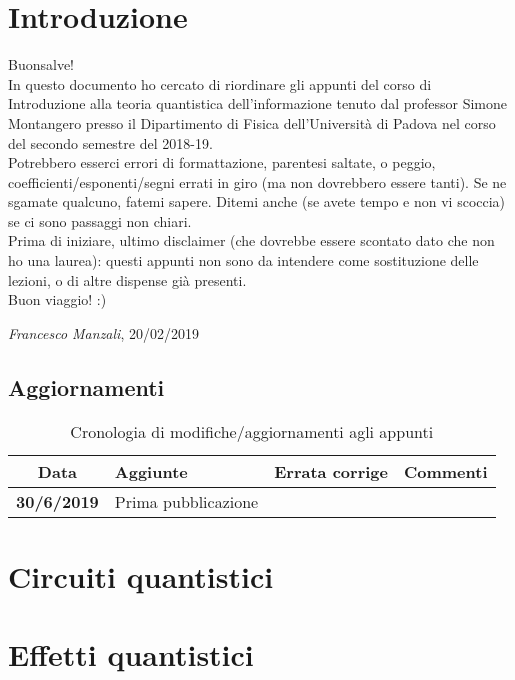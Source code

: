 \documentclass[12pt]{report} %
\theoremstyle{plain}
\theoremstyle{definition}
\theoremstyle{remark}
\begin{document}
\chapter*{Introduzione}
Buonsalve!\\
In questo documento ho cercato di riordinare gli appunti del corso di Introduzione alla teoria quantistica dell'informazione tenuto dal professor Simone Montangero presso il Dipartimento di Fisica dell'Università di Padova nel corso del secondo semestre del 2018-19.\\
Potrebbero esserci errori di formattazione, parentesi saltate, o peggio, coefficienti/esponenti/segni errati in giro (ma non dovrebbero essere tanti). Se ne sgamate qualcuno, fatemi sapere. Ditemi anche (se avete tempo e non vi scoccia) se ci sono passaggi non chiari.\\
Prima di iniziare, ultimo disclaimer (che dovrebbe essere scontato dato che non ho una laurea): questi appunti non sono da intendere come sostituzione delle lezioni, o di altre dispense già presenti.\\
Buon viaggio! :)

\begin{flushright}
\textit{Francesco Manzali}, 20/02/2019
\end{flushright}
\clearpage
\section*{Aggiornamenti}
\begin{table}[hb]
    \centering
    \begin{tabular}{|cm{3cm}m{5cm}m{3cm}|}\toprule
        Data & Aggiunte & Errata corrige & Commenti\\\midrule
        \textbf{30/6/2019} & Prima pubblicazione & & \\
        \bottomrule
    \end{tabular}
    \caption{Cronologia di modifiche/aggiornamenti agli appunti}
    \label{updates}
\end{table}

\clearpage

\chapter{Circuiti quantistici}




\chapter{Effetti quantistici}

\end{document}
